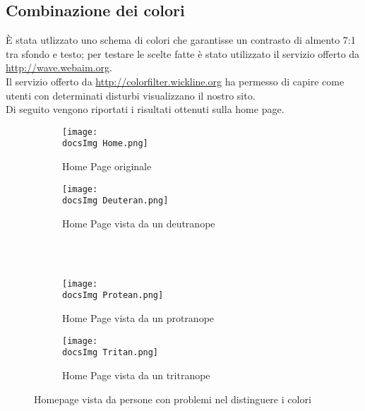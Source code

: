 {	\subsection{Combinazione dei colori}{
		È stata utlizzato uno schema di colori che garantisse un contrasto di almento 7:1 tra sfondo e testo; per testare le scelte fatte è stato utilizzato il servizio offerto da \url{http://wave.webaim.org}.\\
		Il servizio offerto da \url{http://colorfilter.wickline.org} ha permesso di capire come utenti con determinati disturbi visualizzano il nostro sito.\\
		Di seguito vengono riportati i risultati ottenuti sulla home page.
		\begin{figure}[H]
			\begin{subfigure}[b]{0.5\textwidth}
				\texttt{[image: \\docsImg Home.png]}
				\caption{Home Page originale}
				\label{Home Page originale}
			\end{subfigure}
			\begin{subfigure}[b]{0.5\textwidth}
				\texttt{[image: \\docsImg Deuteran.png]}
				\caption{Home Page vista da un deutranope}
				\label{Home Page vista da un deutranope}
			\end{subfigure}
			\\
			\\
			\begin{subfigure}[b]{0.5\textwidth}
				\texttt{[image: \\docsImg Protean.png]}
				\caption{Home Page vista da un protranope}
				\label{Home Page vista da un protranope}
			\end{subfigure}
			\begin{subfigure}[b]{0.5\textwidth}
			\texttt{[image: \\docsImg Tritan.png]}
				\caption{Home Page vista da un tritranope}
				\label{Home Page vista da un tritranope}
			\end{subfigure}
			\caption{Homepage vista da persone con problemi nel distinguere i colori}
			\label{fig: Homepage vista da persone con problemi nel distinguere i colori}
		\end{figure}
	}
}
